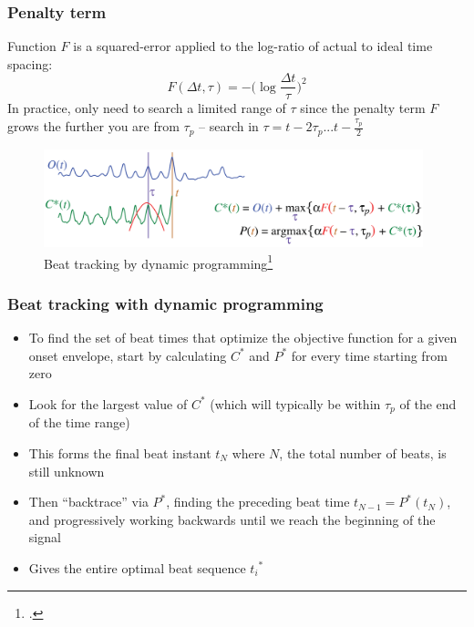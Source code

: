 \documentclass{beamer}
\begin{document}
\begin{frame}
	\frametitle{Penalty term}
	Function $F$ is a squared-error applied to the log-ratio of actual to ideal time spacing:
	\[ F(\Delta t, \tau) = -\Big(\log\frac{\Delta t}{\tau}\Big)^{2} \]
	In practice, only need to search a limited range of $\tau$ since the penalty term $F$ grows the further you are from $\tau_{p}$ -- search in $\tau = t - 2\tau_{p} ... t - \frac{\tau_{p}}{2}$
	\begin{figure}
		\includegraphics[width=11cm]{./ellisdp.png}
		\caption{Beat tracking by dynamic programming\footcite{ellis2}}
	\end{figure}
\end{frame}

\begin{frame}
	\frametitle{Beat tracking with dynamic programming}
	\begin{itemize}
		\item
			To find the set of beat times that optimize the objective function for a given onset envelope, start by calculating $C^{*}$ and $P^{*}$ for every time starting from zero
		\item
			Look for the largest value of $C^{*}$ (which will typically be within $\tau_{p}$ of the end of the time range)
		\item
			This forms the final beat instant $t_{N}$ where $N$, the total number of beats, is still unknown
		\item
			Then ``backtrace'' via $P^{*}$, finding the preceding beat time $t_{N-1} = P^{*}(t_{N})$,  and  progressively working backwards until we reach the beginning of the signal
		\item
			Gives the entire optimal beat sequence ${t_{i}}^{*}$
	\end{itemize}
\end{frame}

\end{document}
